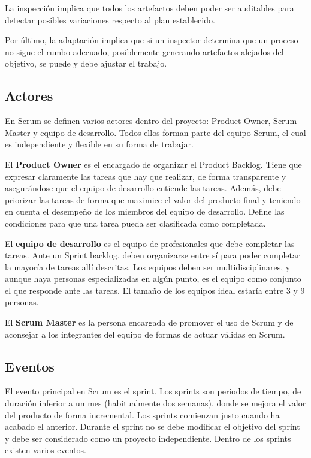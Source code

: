\documentclass[openright,twoside,12pt]{book}
\begin{document}
La inspección implica que todos los artefactos deben poder ser auditables para detectar posibles variaciones respecto al plan establecido.

Por último, la adaptación implica que si un inspector determina que un proceso no sigue el rumbo adecuado, posiblemente generando artefactos alejados del objetivo, se puede y debe ajustar el trabajo.

\subsection{Actores}
En Scrum se definen varios actores dentro del proyecto: Product Owner, Scrum Master y equipo de desarrollo. Todos ellos forman parte del equipo Scrum, el cual es independiente y flexible en su forma de trabajar.

El \textbf{Product Owner} es el encargado de organizar el Product Backlog. Tiene que expresar claramente las tareas que hay que realizar, de forma transparente y asegurándose que el equipo de desarrollo entiende las tareas. Además, debe priorizar las tareas de forma que maximice el valor del producto final y teniendo en cuenta el desempeño de los miembros del equipo de desarrollo. Define las condiciones para que una tarea pueda ser clasificada como completada.

El \textbf{equipo de desarrollo} es el equipo de profesionales que debe completar las tareas. Ante un Sprint backlog, deben organizarse entre sí para poder completar la mayoría de tareas allí descritas. Los equipos deben ser multidisciplinares, y aunque haya personas especializadas en algún punto, es el equipo como conjunto el que responde ante las tareas. El tamaño de los equipos ideal estaría entre 3 y 9 personas.

El \textbf{Scrum Master} es la persona encargada de promover el uso de Scrum y de aconsejar a los integrantes del equipo de formas de actuar válidas en Scrum.

\subsection{Eventos}

El evento principal en Scrum es el sprint. Los sprints son periodos de tiempo, de duración inferior a un mes (habitualmente dos semanas), donde se mejora el valor del producto de forma incremental. Los sprints comienzan justo cuando ha acabado el anterior. Durante el sprint no se debe modificar el objetivo del sprint y debe ser considerado como un proyecto independiente. Dentro de los sprints existen varios eventos.
\end{document}
